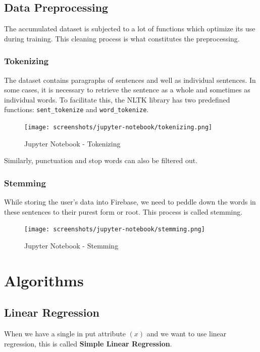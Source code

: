 \pagebreak

\subsection{Data Preprocessing}

The accumulated dataset is subjected to a lot of functions which optimize its use during training. This cleaning process is what constitutes the preprocessing.

\subsubsection{Tokenizing}
The dataset contains paragraphs of sentences and well as individual sentences. In some cases, it is necessary to retrieve the sentence as a whole and sometimes as individual words. To facilitate this, the NLTK library has two predefined functions: \texttt{sent\_tokenize} and \texttt{word\_tokenize}.

\begin{figure}[H]
    \centering
    \texttt{[image: screenshots/jupyter-notebook/tokenizing.png]}
    \caption{Jupyter Notebook - Tokenizing}
\end{figure}

Similarly, punctuation and stop words can also be filtered out.

\subsubsection{Stemming}
While storing the user’s data into Firebase, we need to peddle down the words in these sentences to their purest form or root. This process is called stemming.

\begin{figure}[H]
    \centering
    \texttt{[image: screenshots/jupyter-notebook/stemming.png]}
    \caption{Jupyter Notebook - Stemming}
\end{figure}

\pagebreak

\section{Algorithms}

\subsection{Linear Regression}

When we have a single in put attribute $(x)$ and we want to use linear regression, this is called \textbf{Simple Linear Regression}.

